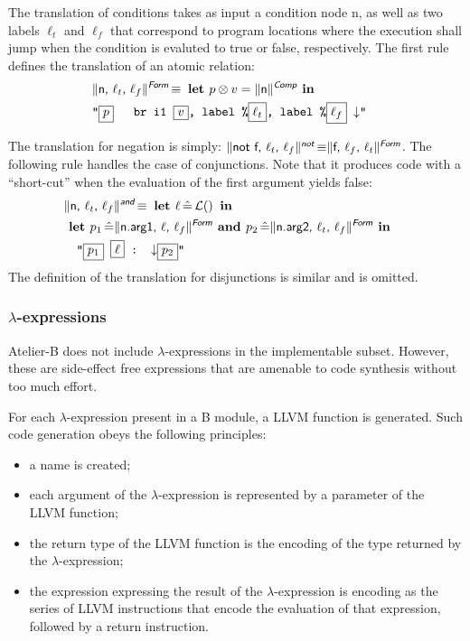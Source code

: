 \documentclass{llncs}
\newcommand{\trad}[2]{\ensuremath{\lVert \textsf{#1} \rVert^{\textit{#2}}}}
\newcommand{\nl}[0]{\ensuremath{\downarrow}}
\DeclareMathOperator{\isdef}{\equiv}
\DeclareMathOperator{\lbl}{\mathcal{L}()}
\newcommand{\llvm}[1]{\texttt{#1}}
\newcommand{\B}[1]{\textsf{#1}}
\newcommand{\LET}[0]{\textbf{ let }}
\DeclareMathOperator{\BE}{\hat{=}}
\newcommand{\IN}[0]{\textbf{ in }}
\newcommand{\AND}[0]{\textbf{ and }}
\newcommand{\PH}[1]{\framebox{$#1$}}
\newcommand{\sep}[0]{\otimes}
\begin{document}
The translation of conditions takes as input a condition node \B{n}, as well as
two labels $\ell_t$ and $\ell_f$ that correspond to program locations where the
execution shall jump when the condition is evaluted to true or false,
respectively.  The first rule defines the translation of an atomic relation:
\begin{align*}
  \lefteqn{\trad{n, $\ell_t$, $\ell_f$}{\B{Form}} \isdef
  \textbf{ let } p \sep v = \trad{n}{\B{Comp}} \IN} \\
  & \llvm{"\PH{p} \quad br i1 \PH{v}, label \%\PH{\ell_t}, label \%\PH{\ell_f} \nl"}
\end{align*}

\noindent The translation for negation is simply: $\trad{not f, $\ell_t$,
  $\ell_f$}{\B{not}} \isdef \trad{f, $\ell_f$, $\ell_t$}{\B{Form}}$.  The
following rule handles the case of conjunctions. Note that it produces code with
a ``short-cut'' when the evaluation of the first argument yields false:
\begin{align*}
\begin{split}
  \lefteqn{\trad{n, $\ell_t$, $\ell_f$}{\B{and}} \isdef \LET \ell \BE \lbl \IN} \\
  & \LET p_1 \BE \trad{n.arg1, $\ell$, $\ell_f$}{\B{Form}}
  \AND p_2 \BE \trad{n.arg2, $\ell_t$, $\ell_f$}{\B{Form}} \IN \\
  & \quad \llvm{"\PH{p_1} \PH{\ell} :  \nl \PH{p_2}"}
\end{split}
\end{align*}
The definition of the translation for disjunctions is similar and is omitted.

\subsubsection{$\lambda$-expressions}

Atelier-B does not include $\lambda$-expressions in the implementable
subset.  However, these are side-effect free expressions that are
amenable to code synthesis without too much effort.

For each $\lambda$-expression present in a B module, a LLVM function
is generated. Such code generation obeys the following principles:
\begin{itemize}
\item a name is created;
\item each argument of the $\lambda$-expression is represented by
  a parameter of the LLVM function;
\item the return type of the LLVM function is the encoding of the type
  returned by the $\lambda$-expression;
\item the expression expressing the result of the $\lambda$-expression
  is encoding as the series of LLVM instructions that encode the evaluation
  of that expression, followed by a return instruction.
\end{itemize}
\end{document}
